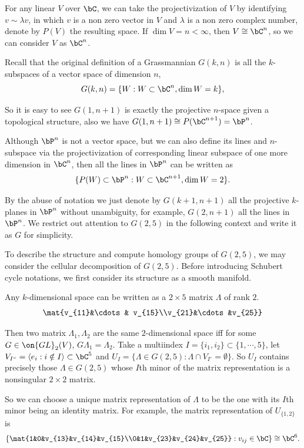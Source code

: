 \documentclass[a4paper, twoside]{article}
\begin{document}
For any linear $V$ over $\bC$, we can take the projectivization of $V$ by identifying $v\sim\lambda v$, in which $v$ is a non zero vector in $V$ and $\lambda$ is a non zero complex number, denote by $P(V)$ the resulting space. If $\dim V=n<\infty$, then $V\cong\bC^n$, so we can consider $V$ as $\bC^n$.

Recall that the original definition of a Grassmannian $G(k,n)$ is all the $k$-subspaces of a vector space of dimension $n$,
$$
G(k,n)=\{W:W\subset\bC^n, \dim W=k\},
$$

So it is easy to see $G(1,n+1)$ is exactly the projective $n$-space given a topological structure, also we have $G(1,n+1)\cong P(\bC^{n+1})=\bP^n$.

Although $\bP^n$ is not a vector space, but we can also define its lines and $n$-subspace via the projectivization of corresponding linear subspace of one more dimension in $\bC^n$, then all the lines in $\bP^n$ can be written as
$$
\{P(W)\subset\bP^n:W\subset\bC^{n+1},\dim W=2\}.
$$

By the abuse of notation we just denote by $G(k+1,n+1)$ all the projective $k$-planes in $\bP^n$ without unambiguity, for example, $G(2,n+1)$ all the lines in $\bP^n$. We restrict out attention to $G(2,5)$ in the following context and write it as $G$ for simplicity.

To describe the structure and compute homology groups of $G(2,5)$, we may consider the cellular decomposition of $G(2,5)$. Before introducing Schubert cycle notations, we first consider its structure as a smooth manifold.

Any $k$-dimensional space can be written as a $2\times 5$ matrix $\Lambda$  of rank $2$.
$$
\mat{v_{11}&\cdots& v_{15}\\v_{21}&\cdots&v_{25}}
$$

Then two matrix $\Lambda_1,\Lambda_2$ are the same $2$-dimensional space iff for some $G\in\on{GL}_2(V)$, $G\Lambda_1=\Lambda_2$. Take a multiindex $I=\{i_1,i_2\}\subset\{1,\cdots,5\}$, let $V_{I^\circ}=\langle e_i:i\notin I\rangle\subset\bC^5$ and $U_I=\{\Lambda\in G(2,5):\Lambda\cap V_{I^{\circ}}=\emptyset\}$. So $U_I$ contains precisely those $\Lambda\in G(2,5)$ whose $I$th minor of the matrix representation is a nonsingular $2\times 2$ matrix.

So we can choose a unique matrix representation of $\Lambda$ to be the one with its $I$th minor being an identity matrix. For example, the matrix representation of $U_{\{1,2\}}$ is
$$
\left\{\mat{1&0&v_{13}&v_{14}&v_{15}\\0&1&v_{23}&v_{24}&v_{25}}:v_{ij}\in\bC\right\}\cong\bC^6.
$$
\end{document}
